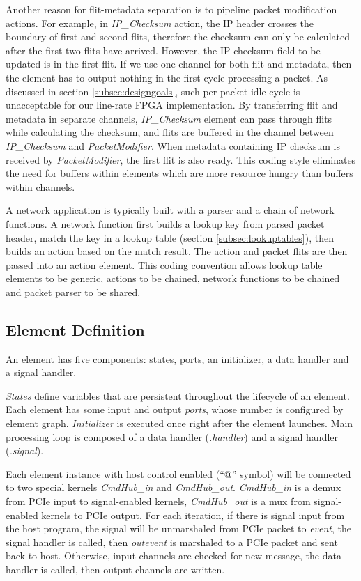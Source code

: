 Another reason for flit-metadata separation is to pipeline packet modification actions. For example, in \textit{IP\_Checksum} action, the IP header crosses the boundary of first and second flits, therefore the checksum can only be calculated after the first two flits have arrived. However, the IP checksum field to be updated is in the first flit. If we use one channel for both flit and metadata, then the element has to output nothing in the first cycle processing a packet. As discussed in section \ref{subsec:designgoals}, such per-packet idle cycle is unacceptable for our line-rate FPGA implementation. By transferring flit and metadata in separate channels, \textit{IP\_Checksum} element can pass through flits while calculating the checksum, and flits are buffered in the channel between \textit{IP\_Checksum} and \textit{PacketModifier}. When metadata containing IP checksum is received by \textit{PacketModifier}, the first flit is also ready. This coding style eliminates the need for buffers within elements which are more resource hungry than buffers within channels.

A network application is typically built with a parser and a chain of network functions. A network function first builds a lookup key from parsed packet header, match the key in a lookup table (section \ref{subsec:lookuptables}), then builds an action based on the match result. The action and packet flits are then passed into an action element. This coding convention allows lookup table elements to be generic, actions to be chained, network functions to be chained and packet parser to be shared.

\subsection{Element Definition}
\label{subsec:elementdef}

An element has five components: states, ports, an initializer, a data handler and a signal handler.

\textit{States} define variables that are persistent throughout the lifecycle of an element. Each element has some input and output \textit{ports}, whose number is configured by element graph. \textit{Initializer} is executed once right after the element launches. Main processing loop is composed of a data handler (\textit{.handler}) and a signal handler (\textit{.signal}).

Each element instance with host control enabled (``@'' symbol) will be connected to two special kernels \textit{CmdHub\_in} and \textit{CmdHub\_out}. \textit{CmdHub\_in} is a demux from PCIe input to signal-enabled kernels, \textit{CmdHub\_out} is a mux from signal-enabled kernels to PCIe output. For each iteration, if there is signal input from the host program, the signal will be unmarshaled from PCIe packet to \textit{event}, the signal handler is called, then \textit{outevent} is marshaled to a PCIe packet and sent back to host. Otherwise, input channels are checked for new message, the data handler is called, then output channels are written.

